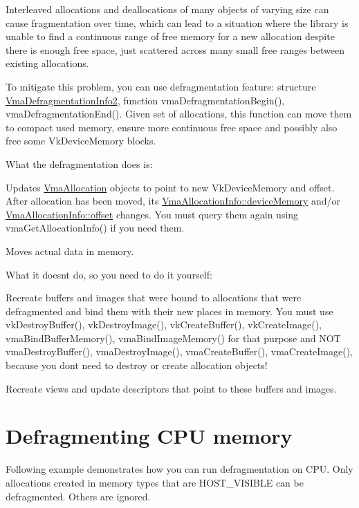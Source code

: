 Interleaved allocations and deallocations of many objects of varying size can cause fragmentation over time, which can lead to a situation where the library is unable to find a continuous range of free memory for a new allocation despite there is enough free space, just scattered across many small free ranges between existing allocations.

To mitigate this problem, you can use defragmentation feature\+: structure \hyperlink{structVmaDefragmentationInfo2}{Vma\+Defragmentation\+Info2}, function vma\+Defragmentation\+Begin(), vma\+Defragmentation\+End(). Given set of allocations, this function can move them to compact used memory, ensure more continuous free space and possibly also free some {\ttfamily Vk\+Device\+Memory} blocks.

What the defragmentation does is\+:


\begin{DoxyItemize}
\item Updates \hyperlink{structVmaAllocation}{Vma\+Allocation} objects to point to new {\ttfamily Vk\+Device\+Memory} and offset. After allocation has been moved, its \hyperlink{structVmaAllocationInfo_ae0bfb7dfdf79a76ffefc9a94677a2f67}{Vma\+Allocation\+Info\+::device\+Memory} and/or \hyperlink{structVmaAllocationInfo_a4a3c732388dbdc7a23f9365b00825268}{Vma\+Allocation\+Info\+::offset} changes. You must query them again using vma\+Get\+Allocation\+Info() if you need them.
\item Moves actual data in memory.
\end{DoxyItemize}

What it doesn\textquotesingle{}t do, so you need to do it yourself\+:


\begin{DoxyItemize}
\item Recreate buffers and images that were bound to allocations that were defragmented and bind them with their new places in memory. You must use {\ttfamily vk\+Destroy\+Buffer()}, {\ttfamily vk\+Destroy\+Image()}, {\ttfamily vk\+Create\+Buffer()}, {\ttfamily vk\+Create\+Image()}, vma\+Bind\+Buffer\+Memory(), vma\+Bind\+Image\+Memory() for that purpose and N\+OT vma\+Destroy\+Buffer(), vma\+Destroy\+Image(), vma\+Create\+Buffer(), vma\+Create\+Image(), because you don\textquotesingle{}t need to destroy or create allocation objects!
\item Recreate views and update descriptors that point to these buffers and images.
\end{DoxyItemize}\hypertarget{defragmentation_defragmentation_cpu}{}\section{Defragmenting C\+P\+U memory}\label{defragmentation_defragmentation_cpu}
Following example demonstrates how you can run defragmentation on C\+PU. Only allocations created in memory types that are {\ttfamily H\+O\+S\+T\+\_\+\+V\+I\+S\+I\+B\+LE} can be defragmented. Others are ignored.

